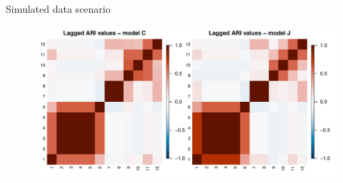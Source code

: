 \documentclass[
	11pt, %
 xcolor={dvipsnames,svgnames}
]{beamer}
\begin{document}
\begin{frame}{Simulated data scenario}

    \begin{table}[!htb]
    \centering
\end{table}
\begin{figure}[!htb]
    \centering
    \includegraphics[width=0.9\linewidth]{Testing/Assessing correctness/no space/ari.pdf}
    \label{fig:ari no space}
\end{figure}
\end{frame}
\end{document}
